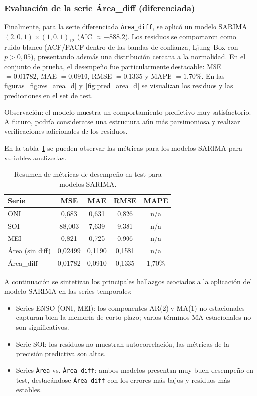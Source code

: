 \subsubsection{Evaluación de la serie Área\_diff (diferenciada)}
Finalmente, para la serie diferenciada \texttt{Área\_diff}, se aplicó un modelo SARIMA\\$(2,0,1)\times(1,0,1)_{12}$ (AIC $\approx -888.2$). 
Los residuos se comportaron como ruido blanco (ACF/PACF dentro de las bandas de confianza, Ljung--Box con $p>0,05$), presentando además una distribución cercana a la normalidad.  
En el conjunto de prueba, el desempeño fue particularmente destacable: MSE $=0.01782$, MAE $=0.0910$, RMSE $=0.1335$ y MAPE $=1.70\%$. En las figuras~\ref{fig:res_area_d} y~\ref{fig:pred_area_d} se visualizan los residuos y las predicciones en el set de test.


Observación: el modelo muestra un comportamiento predictivo muy satisfactorio. A futuro, podría considerarse una estructura aún más parsimoniosa y realizar verificaciones adicionales de los residuos.  
\vspace{0.3em}



En la tabla~\ref{tab:metricas_sarima} se pueden observar las métricas para los modelos SARIMA para variables analizadas. 

\begin{table}[H]
\centering
\caption{Resumen de métricas de desempeño en test para modelos SARIMA.}
\label{tab:metricas_sarima}
\begin{tabular}{lcccc}
\toprule
\textbf{Serie} & \textbf{MSE} & \textbf{MAE} & \textbf{RMSE} & \textbf{MAPE} \\
\midrule
ONI  & 0,683  & 0,631  & 0,826  & n/a \\
SOI  & 88,003 & 7,639  & 9,381  & n/a \\
MEI  & 0,821  & 0,725  & 0.906  & n/a \\
Área (sin diff) & 0,02499 & 0,1190 & 0,1581 & n/a \\
Área\_diff      & 0,01782 & 0,0910 & 0,1335 & 1,70\% \\
\bottomrule
\end{tabular}
\end{table}

A continuación se sintetizan los principales hallazgos asociados a la aplicación del modelo SARIMA en las series temporales:

\begin{itemize}
    \item Series ENSO (ONI, MEI): los componentes AR(2) y MA(1) no estacionales
    capturan bien la memoria de corto plazo; varios términos MA estacionales no son
    significativos.
    \item Serie SOI: los residuos no muestran autocorrelación, las métricas de la precisión predictiva son altas.
    \item Series \texttt{Área} vs. \texttt{Área\_diff}: ambos modelos presentan muy buen desempeño en test,
    destacándose \texttt{Área\_diff} con los errores más bajos y residuos más
    estables.
\end{itemize}

